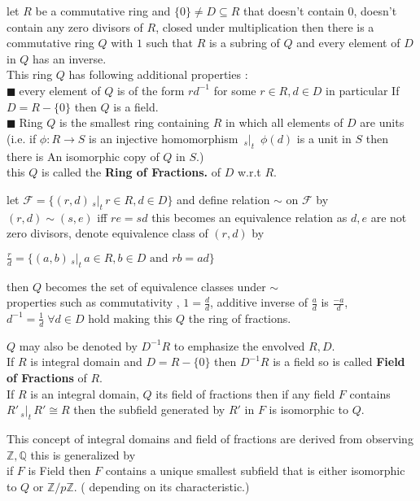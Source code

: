 \documentclass[11pt]{extarticle}
\newcommand{\ra}{\rightarrow}
\newcommand{\Z}{\mathbb{Z}}
\newcommand{\Q}{\mathbb{Q}}
\newcommand{\w}[1]{\text{#1}}
\newcommand{\snote}[1]{{\footnotesize(#1)}}
\newcommand{\st}{\,{}_{s}|_t\,}
\newcommand{\tbx}[2][]{
	\begin{tcolorbox}[enhanced,breakable,size=small,colback=black!2!white,title={#1},arc is angular, arc=1.5mm,drop fuzzy shadow]
		#2
	\end{tcolorbox}
}
\newcommand{\y}{$\blacksquare\;$}
\begin{document}
\begin{multicols}{2}
\tbx{let $ R $ be a commutative ring and $ \{0\}\neq D\subseteq R $ that doesn't contain $ 0 $, doesn't contain any zero divisors of $ R $, closed under multiplication then there is a commutative ring $ Q $ with $ 1 $ such that 
			$ R $ is a subring of $  Q$ and every element of $ D $ in $ Q $ has an inverse.\\
			This ring $ Q $ has  following additional properties :\\
			\y every element of $ Q $ is of the form $ rd^{-1} $ for some $ r\in R, d\in D $ in particular If 
			$ D=R-\{0\} $ then $ Q $ is a field.\\
			\y Ring $ Q $ is the smallest ring containing $ R $ in which all elements of $ D $ are units \\
			\snote{i.e. if $ \phi : R\ra S $ is an injective homomorphism $ \st $ $ \phi(d) $ is a unit in 
				$ S $ then there is An isomorphic copy of $ Q $ in $ S .$}\\
			this $ Q $ is called the \textbf{Ring of Fractions.} of $ D $ w.r.t $ R. $
			} 
\tbx[Construction of Ring of fractions ]{
			let $ \mathcal{ F} = \{ (r,d) \st r\in R, d\in D \}$ and define relation $ \sim $ on 
			$ \mathcal{ F} $ by $ (r,d)\sim (s,e) $ iff $ re=sd $ this becomes an equivalence relation as 
			$d,e$ are not zero divisors, denote equivalence class of $ (r,d) $ by 
			\begin{center}
				$\frac{ r}{  d}=\{ (a,b)\st a\in R, b\in D \w{ and } rb=ad\} $ 
			\end{center}
			then $ Q $ becomes the set of equivalence classes under $ \sim $ \\
			properties such as commutativity , $1= \frac{ d}{d  }$, additive inverse of $ \frac{ a}{  d} $
			is $ \frac{ -a}{  d} $, $ d^{-1}= \frac{ 1}{  d} \; \forall d\in D$ hold making this $ Q $ the 
			ring of fractions.
			} 
\tbx{$ Q $ may also be denoted by $ D^{-1}R $ to emphasize the envolved $ R,D .$\\
If $ R $ is integral domain and $ D=R-\{0\} $ then $ D^{-1}R $ is a field so is called 
			\textbf{ Field of Fractions} of $ R .$\\
If $ R$ is an integral domain, $ Q $ its field of fractions then if any field $ F $ contains
			$ R' \st R'\cong R $ then the subfield generated by $ R' $ in $ F $ is isomorphic to $ Q. $
			} 
\tbx{This concept of integral domains and field of fractions are derived from observing $ \Z,\Q $
			this is generalized by\\
			if $ F $ is Field then $ F $ contains a unique smallest subfield that is either isomorphic to 
			$Q $ or $ \Z/p\Z .$ \snote{ depending on its characteristic.}}
			

\end{multicols}
\end{document}
